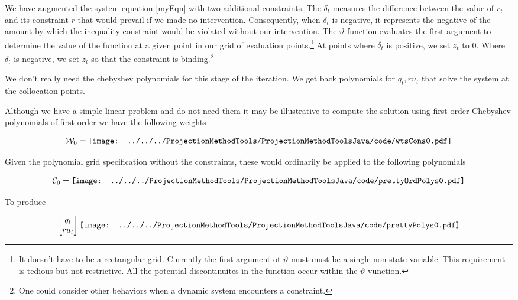 \documentclass[12pt]{article}
\begin{document}
We have augmented the system equation \ref{myEqn} with 
two additional constraints.
The $\delta_t$ measures the difference between the value of $r_t$ and its constraint $\bar{r}$ that would prevail if we made no intervention.  Consequently, when $\delta_t$ is negative, it represents the negative of the amount by which the inequality constraint would be violated without our intervention.  The $\vartheta$ function evaluates the first argument to determine the value of the function at a given point in our grid of evaluation points.\footnote{It doesn't have to be a rectangular grid.  Currently the first argument ot $\vartheta$ must must be a single non state variable.  This requirement is tedious but not restrictive.  All the potential discontinuites in the function occur within the $\vartheta$ vunction.} At points where $\delta_t$ is positive, we set $z_t$ to 0.  Where $\delta_t$ is negative, we set $z_t$ so that the constraint is binding.\footnote{ One could consider other behaviors when a dynamic system encounters a constraint.}

We don't really need the chebyshev polynomials for this stage of the iteration.
We get back polynomials for $q_t, ru_t$ that solve the system at the collocation points.

Although we have a simple linear problem and do not need them it may be illustrative to 
compute the solution using first order Chebyshev polynomials of first order we have the following weights

 \begin{gather*}
\mathcal{W}_0=   \vcenter{\hbox{\texttt{[image: ../../../ProjectionMethodTools/ProjectionMethodToolsJava/code/wtsCons0.pdf]}}}
 \end{gather*}


Given the polynomial grid specification without the constraints, these would ordinarily be applied to the following polynomials


 \begin{gather*}
\mathcal{C}_0=   \vcenter{\hbox{\texttt{[image: ../../../ProjectionMethodTools/ProjectionMethodToolsJava/code/prettyOrdPolys0.pdf]}}}
 \end{gather*}

To produce

 \begin{gather*}
   \begin{bmatrix}
     q_t\\ru_t
   \end{bmatrix}
\vcenter{\hbox{\texttt{[image: ../../../ProjectionMethodTools/ProjectionMethodToolsJava/code/prettyPolys0.pdf]}}}
 \end{gather*}
\end{document}
